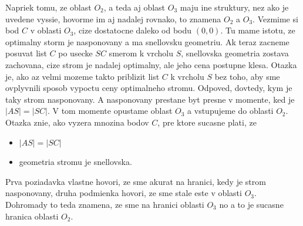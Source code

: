 \documentclass[12pt]{book}
\begin{document}
Napriek tomu, ze oblast $O_{2}$, a teda aj oblast $O_{3}$ maju ine struktury,
    nez ako je uvedene vyssie, hovorme im aj nadalej rovnako, to znamena
    $O_{2}$ a $O_{3}$.
Vezmime si bod $C$ v oblasti $O_{3}$, cize dostatocne daleko od bodu $(0,0)$.
Tu mame istotu, ze optimalny storm je nasponovany a ma snellovsku geometriu.
Ak teraz zacneme posuvat list $C$ po usecke $SC$ smerom k vrcholu $S$,
    snellovska geometria zostava zachovana, cize strom je nadalej optimalny,
    ale jeho cena postupne klesa.
Otazka je, ako az velmi mozeme takto priblizit list $C$ k vrcholu $S$ bez
    toho, aby sme ovplyvnili sposob vypoctu ceny optimalneho stromu.
Odpoved, dovtedy, kym je taky strom nasponovany.
A nasponovany prestane byt presne v momente, ked je $|AS|=|SC|$.
V tom momente opustame oblast $O_{3}$ a vstupujeme do oblasti $O_{2}$.
Otazka znie, ako vyzera mnozina bodov $C$, pre ktore sucasne plati, ze
    \begin{itemize}
        \item $|AS|=|SC|$
        \item geometria stromu je snellovska.
    \end{itemize}
Prva poziadavka vlastne hovori, ze sme akurat na hranici, kedy je strom
    nasponovany, druha podmienka hovori, ze sme stale este v oblasti $O_{3}$.
Dohromady to teda znamena, ze sme na hranici oblasti $O_{3}$ no a to je sucasne
    hranica oblasti $O_{2}$.
\end{document}
